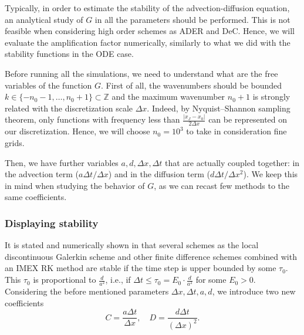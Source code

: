 Typically, in order to estimate the stability of the advection-diffusion equation, an analytical study of $G$ in all the parameters should be performed. 
This is not feasible when considering high order schemes as ADER and DeC.
Hence, we will evaluate the amplification factor numerically, similarly to what we did with the stability functions in the ODE case.

Before running all the simulations, we need to understand what are the free variables of the function $G$. First of all, the wavenumbers  should be bounded $k \in \lbrace -n_0-1 , \dots, n_0+1 \rbrace \subset \mathbb Z$ and the maximum wavenumber $n_0+1$ is strongly related with the discretization scale $\Delta x$. Indeed, by  Nyquist–Shannon sampling theorem, only functions with frequency less than $\frac{|x_J-x_0|}{2\Delta x}$ can be represented on our discretization. Hence, we will choose $n_0=10^3$ to take in consideration fine grids.

Then, we have further variables $a,d,\Delta x,\Delta t $ that are actually coupled together: in the advection term ($a\Delta t/\Delta x$) and in the diffusion term ($d\Delta t/\Delta x^2$). We keep this in mind when studying the behavior of $G$, as we can recast few methods to the same coefficients.

\subsubsection{Displaying stability}
It is stated and numerically shown in \cite{TanChenShu_ImEx_Stability, WangShuZhang_LDG1_2015,WangShuZhang_LDG_2016} that several schemes as the local discontinuous Galerkin scheme \cite{WangShuZhang_LDG1_2015,WangShuZhang_LDG_2016} and other finite difference schemes combined with an IMEX RK method are stable if the time step is upper bounded by some $\tau_0$. This $\tau_0$ is proportional to $\frac{d}{a^2}$, i.e., if $\Delta t\le\tau_0= E_0\cdot \frac{d}{a^2}$ for some $E_0>0$.
Considering the before mentioned parameters $\Delta x, \Delta t, a,d$, we introduce two new coefficients
\begin{equation}
C=\frac{a\Delta t}{\Delta x}, \quad D=\frac{d\Delta t}{{(\Delta x)}^2}.
\end{equation}

